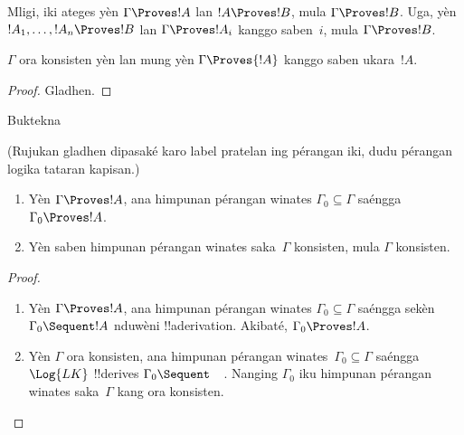\documentclass[../../../include/open-logic-section]{subfiles}
\begin{document}
Mligi, iki ateges yèn $\Gamma \Proves !A$ lan $!A
\Proves !B$, mula $\Gamma \Proves !B$.
Uga, yèn $!A_1, \dots, !A_n \Proves !B$
lan $\Gamma \Proves !A_i$ kanggo saben~$i$,
mula $\Gamma \Proves !B$.

\begin{prop}
$\Gamma$ ora konsisten yèn lan mung yèn
$\Gamma \Proves {!A}$ kanggo saben ukara~$!A$.
\end{prop}

\begin{proof}
Gladhen.
\end{proof}

\begin{prob}
Buktekna 
\end{prob}
(Rujukan gladhen dipasaké karo label pratelan ing pérangan iki, dudu pérangan logika tataran kapisan.)

\begin{prop}[Kompaknes]
  \begin{enumerate}
  \item Yèn $\Gamma \Proves !A$, ana himpunan pérangan winates
    $\Gamma_0 \subseteq \Gamma$ saéngga
    $\Gamma_0 \Proves !A$.
  \item Yèn saben himpunan pérangan winates saka~$\Gamma$
    konsisten, mula $\Gamma$ konsisten.
  \end{enumerate}
\end{prop}

\begin{proof}
  \begin{enumerate}
    \item Yèn $\Gamma \Proves !A$, ana himpunan pérangan winates
      $\Gamma_0 \subseteq \Gamma$ saéngga sekèn
      $\Gamma_0 \Sequent !A$ nduwèni !!a{derivation}.
      Akibaté, $\Gamma_0 \Proves !A$.
    \item Yèn $\Gamma$ ora konsisten, ana himpunan pérangan
      winates~$\Gamma_0 \subseteq \Gamma$ saéngga $\Log{LK}$
      !!{derive}s $\Gamma_0 \Sequent \quad$.
      Nanging $\Gamma_0$ iku himpunan pérangan winates
      saka~$\Gamma$ kang ora konsisten.
  \end{enumerate}
\end{proof}
\end{document}
